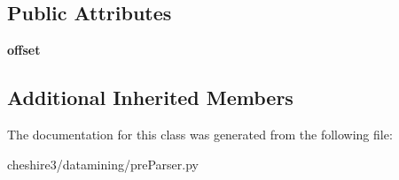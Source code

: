 \subsection*{Public Attributes}
\begin{DoxyCompactItemize}
\item 
\hypertarget{classcheshire3_1_1datamining_1_1pre_parser_1_1_vector_renumber_pre_parser_a1598c8fd621358e9fab7a5456d26925b}{{\bfseries offset}}\label{classcheshire3_1_1datamining_1_1pre_parser_1_1_vector_renumber_pre_parser_a1598c8fd621358e9fab7a5456d26925b}

\end{DoxyCompactItemize}
\subsection*{Additional Inherited Members}


The documentation for this class was generated from the following file\-:\begin{DoxyCompactItemize}
\item 
cheshire3/datamining/pre\-Parser.\-py\end{DoxyCompactItemize}
